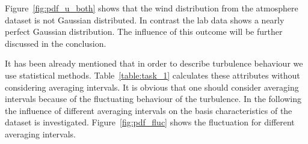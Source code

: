 \documentclass[12pt]{article}
\begin{document}
Figure~\ref{fig:pdf_u_both} shows that the wind distribution from the atmosphere dataset is not Gaussian distributed. In contrast the lab data shows a nearly perfect Gaussian distribution. The influence of this outcome will be further discussed in the conclusion.


It has been already mentioned that in order to describe turbulence behaviour we use statistical methods. Table~\ref{table:task_1} calculates these attributes without considering averaging intervals. It is obvious that one should consider averaging intervals because of the fluctuating behaviour of the turbulence. In the following the influence of different averaging intervals on the basis characteristics of the dataset is investigated.
Figure~\ref{fig:pdf_fluc} shows the fluctuation for different averaging intervals.
\end{document}

